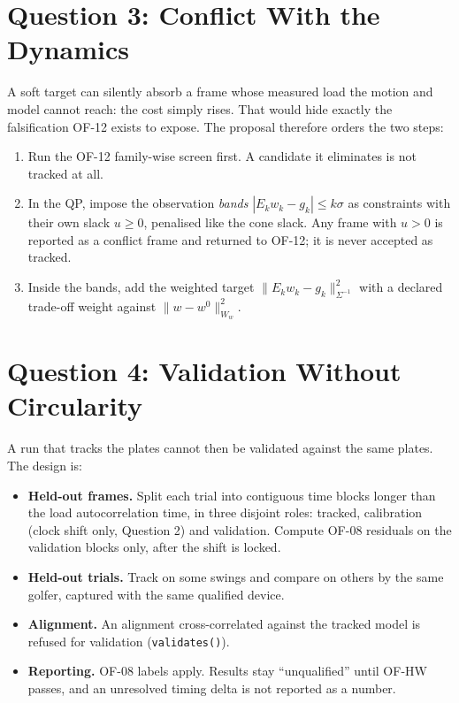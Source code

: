 \documentclass[11pt]{article}
\begin{document}
\section{Question 3: Conflict With the Dynamics}

A soft target can silently absorb a frame whose measured load the motion and
model cannot reach: the cost simply rises. That would hide exactly the
falsification OF-12 exists to expose. The proposal therefore orders the
two steps:
\begin{enumerate}
  \item Run the OF-12 family-wise screen first. A candidate it eliminates is
        not tracked at all.
  \item In the QP, impose the observation \emph{bands}
        $|E_k w_k - g_k| \le k\sigma$ as constraints with their own slack
        $u \ge 0$, penalised like the cone slack. Any frame with $u > 0$ is
        reported as a conflict frame and returned to OF-12; it is never
        accepted as tracked.
  \item Inside the bands, add the weighted target
        $\|E_k w_k - g_k\|^2_{\Sigma^{-1}}$ with a declared trade-off weight
        against $\|w-w^0\|^2_{W_w}$.
\end{enumerate}

\section{Question 4: Validation Without Circularity}

A run that tracks the plates cannot then be validated against the same
plates. The design is:
\begin{itemize}
  \item \textbf{Held-out frames.} Split each trial into contiguous time
        blocks longer than the load autocorrelation time, in three disjoint
        roles: tracked, calibration (clock shift only, Question 2) and
        validation. Compute OF-08 residuals on the validation blocks only,
        after the shift is locked.
  \item \textbf{Held-out trials.} Track on some swings and compare on others
        by the same golfer, captured with the same qualified device.
  \item \textbf{Alignment.} An alignment cross-correlated against the
        tracked model is refused for validation (\texttt{validates()}).
  \item \textbf{Reporting.} OF-08 labels apply. Results stay ``unqualified''
        until OF-HW passes, and an unresolved timing delta is not reported
        as a number.
\end{itemize}
\end{document}
